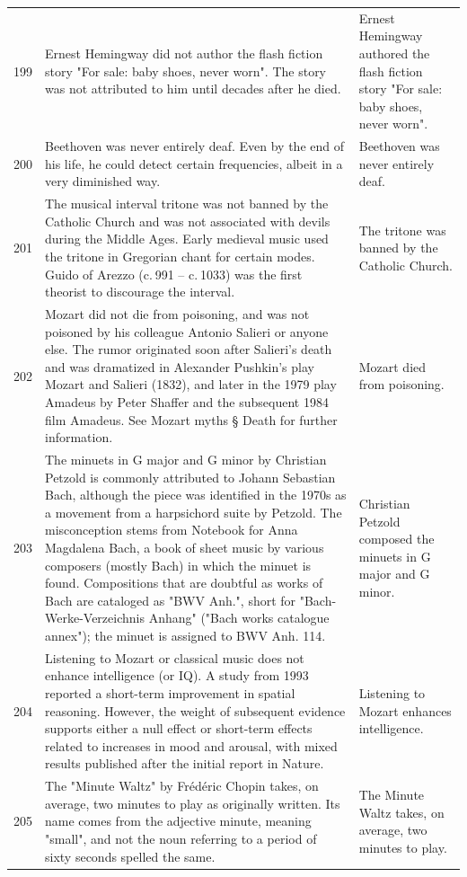 \begin{tabular}{c|p{}|p{}}
199 & Ernest Hemingway did not author the flash fiction story "For sale: baby shoes, never worn". The story was not attributed to him until decades after he died. & Ernest Hemingway authored the flash fiction story "For sale: baby shoes, never worn". \\
200 & Beethoven was never entirely deaf. Even by the end of his life, he could detect certain frequencies, albeit in a very diminished way. & Beethoven was never entirely deaf. \\
201 & The musical interval tritone was not banned by the Catholic Church and was not associated with devils during the Middle Ages. Early medieval music used the tritone in Gregorian chant for certain modes. Guido of Arezzo (c. 991 – c. 1033) was the first theorist to discourage the interval. & The tritone was banned by the Catholic Church. \\
202 & Mozart did not die from poisoning, and was not poisoned by his colleague Antonio Salieri or anyone else. The rumor originated soon after Salieri's death and was dramatized in Alexander Pushkin's play Mozart and Salieri (1832), and later in the 1979 play Amadeus by Peter Shaffer and the subsequent 1984 film Amadeus. See Mozart myths § Death for further information. & Mozart died from poisoning. \\
203 & The minuets in G major and G minor by Christian Petzold is commonly attributed to Johann Sebastian Bach, although the piece was identified in the 1970s as a movement from a harpsichord suite by Petzold. The misconception stems from Notebook for Anna Magdalena Bach, a book of sheet music by various composers (mostly Bach) in which the minuet is found. Compositions that are doubtful as works of Bach are cataloged as "BWV Anh.", short for "Bach-Werke-Verzeichnis Anhang" ("Bach works catalogue annex"); the minuet is assigned to BWV Anh. 114. & Christian Petzold composed the minuets in G major and G minor. \\
204 & Listening to Mozart or classical music does not enhance intelligence (or IQ). A study from 1993 reported a short-term improvement in spatial reasoning. However, the weight of subsequent evidence supports either a null effect or short-term effects related to increases in mood and arousal, with mixed results published after the initial report in Nature. & Listening to Mozart enhances intelligence. \\
205 & The "Minute Waltz" by Frédéric Chopin takes, on average, two minutes to play as originally written. Its name comes from the adjective minute, meaning "small", and not the noun referring to a period of sixty seconds spelled the same. & The Minute Waltz takes, on average, two minutes to play. \\

\end{tabular}
